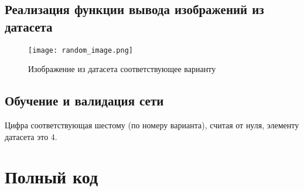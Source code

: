 \documentclass[14pt]{extarticle}
\begin{document}
    \subsection{Реализация функции вывода изображений из датасета}
    \begin{figure}[H]
        \centering
        \texttt{[image: random\_image.png]}
        \caption{Изображение из датасета соответствующее варианту}
    \end{figure}

    \subsection{Обучение и валидация сети}
    Цифра соответствующая шестому (по номеру варианта), считая от нуля, элементу датасета это 4.

    \pagebreak
    \section*{Полный код}
\end{document}
